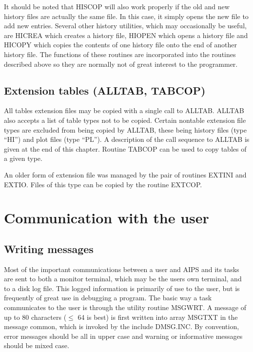 It should be noted that HISCOP will also work properly if the old and
new history files are actually the same file.  In this case, it simply
opens the new file to add new entries.  Several other history
utilities, which may occasionally be useful, are HICREA which creates
a history file, HIOPEN which opens a history file and HICOPY which
copies the contents of one history file onto the end of another
history file.  The functions of these routines are incorporated into
the routines described above so they are normally not of great
interest to the programmer.

\subsection{Extension tables (ALLTAB, TABCOP)}
All tables extension files may be copied with a single call to ALLTAB.
ALLTAB also accepts a list of table types not to be copied. Certain
nontable extension file types are excluded from being copied by
ALLTAB, these being history files (type ``HI'') and plot files (type
``PL'').  A description of the call sequence to ALLTAB is given at the
end of this chapter.  Routine TABCOP can be used to copy tables of a
given type.

An older form of extension file was managed by the pair of routines
EXTINI and EXTIO.  Files of this type can be copied by the routine
EXTCOP.


\section{Communication with the user}
\subsection{Writing messages}

Most of the important communications between a user and AIPS and its
tasks are sent to both a monitor terminal, which may be the users own
terminal, and to a disk log file.  This logged information is
primarily of use to the user, but is frequently of great use in
debugging a program.  The basic way a task communicates to the user is
through the utility routine MSGWRT.  A message of up to 80 characters
($\leq$ 64 is best) is first written into array MSGTXT in the message
common, which is invoked by the include DMSG.INC.  By convention,
error messages should be all in upper case and warning or informative
messages should be mixed case.

